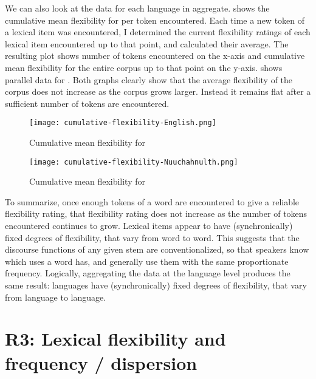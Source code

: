 We can also look at the data for each language in aggregate.  shows the cumulative mean flexibility for  per token encountered. Each time a new token of a lexical item was encountered, I determined the current flexibility ratings of each lexical item encountered up to that point, and calculated their average. The resulting plot shows number of tokens encountered on the x-axis and cumulative mean flexibility for the entire corpus up to that point on the y-axis.  shows parallel data for . Both graphs clearly show that the average flexibility of the corpus does not increase as the corpus grows larger. Instead it remains flat after a sufficient number of tokens are encountered.

\begin{figure}[h!]
  \centering
  \caption{Cumulative mean flexibility for }
  \label{fig:cumulative-flexibility-English}
  \texttt{[image: cumulative-flexibility-English.png]}
\end{figure}

\begin{figure}[h!]
  \centering
  \caption{Cumulative mean flexibility for }
  \label{fig:cumulative-flexibility-Nuuchahnulth}
  \texttt{[image: cumulative-flexibility-Nuuchahnulth.png]}
\end{figure}

To summarize, once enough tokens of a word are encountered to give a reliable flexibility rating, that flexibility rating does not increase as the number of tokens encountered continues to grow. Lexical items appear to have (synchronically) fixed degrees of flexibility, that vary from word to word. This suggests that the discourse functions of any given stem are conventionalized, so that speakers know which uses a word has, and generally use them with the same proportionate frequency. Logically, aggregating the data at the language level produces the same result: languages have (synchronically) fixed degrees of flexibility, that vary from language to language.

\section{R3: Lexical flexibility and frequency / dispersion}
\label{sec:4.5}

